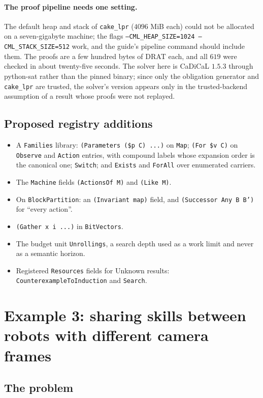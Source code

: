 \documentclass[11pt]{article}
\newcommand{\code}[1]{\texttt{#1}}
\theoremstyle{definition}
\theoremstyle{plain}
\begin{document}
\paragraph{The proof pipeline needs one setting.} The default heap and stack of \code{cake\_lpr}
($4096$ MiB each) could not be allocated on a seven-gigabyte machine; the flags
\code{--CML\_HEAP\_SIZE=1024 --CML\_STACK\_SIZE=512} work, and the guide's pipeline command should
include them. The proofs are a few hundred bytes of DRAT each, and all $619$ were checked in about
twenty-five seconds. The solver here is CaDiCaL $1.5.3$ through python-sat rather than the pinned
binary; since only the obligation generator and \code{cake\_lpr} are trusted, the solver's version
appears only in the trusted-backend assumption of a result whose proofs were not replayed.

\subsection{Proposed registry additions}

\begin{itemize}
\item A \code{Families} library: \code{(Parameters (\$p C) ...)} on \code{Map}; \code{(For \$v C)} on
\code{Observe} and \code{Action} entries, with compound labels whose expansion order is the canonical
one; \code{Switch}; and \code{Exists} and \code{ForAll} over enumerated carriers.
\item The \code{Machine} fields \code{(ActionsOf M)} and \code{(Like M)}.
\item On \code{BlockPartition}: an \code{(Invariant map)} field, and \code{(Successor Any B B')} for
``every action''.
\item \code{(Gather x i ...)} in \code{BitVectors}.
\item The budget unit \code{Unrollings}, a search depth used as a work limit and never as a semantic
horizon.
\item Registered \code{Resources} fields for Unknown results: \code{CounterexampleToInduction} and
\code{Search}.
\end{itemize}
\section{Example 3: sharing skills between robots with different camera frames}\label{sec:ex3}

\subsection{The problem}
\end{document}
